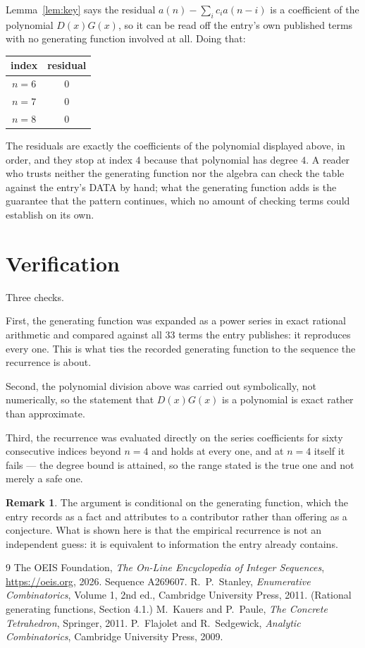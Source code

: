 \documentclass[11pt,a4paper]{article}
\theoremstyle{plain}
\theoremstyle{definition}
\newtheorem{remark}[theorem]{Remark}
\begin{document}
Lemma~\ref{lem:key} says the residual $a(n)-\sum_ic_ia(n-i)$ is a coefficient of the
polynomial $D(x)G(x)$, so it can be read off the entry's own published terms with no
generating function involved at all. Doing that:
\begin{center}
\begin{tabular}{cc}
index & residual \\ \hline
$n=6$ & $0$ \\
$n=7$ & $0$ \\
$n=8$ & $0$
\end{tabular}
\end{center}
The residuals are exactly the coefficients of the polynomial displayed above, in order, and
they stop at index $4$ because that polynomial has degree $4$. A reader who trusts
neither the generating function nor the algebra can check the table against the entry's DATA
by hand; what the generating function adds is the guarantee that the pattern continues, which
no amount of checking terms could establish on its own.

\section{Verification}

Three checks.

First, the generating function was expanded as a power series in exact rational arithmetic and
compared against all $33$ terms the entry publishes: it reproduces every one. This is
what ties the recorded generating function to the sequence the recurrence is about.

Second, the polynomial division above was carried out symbolically, not numerically, so the
statement that $D(x)G(x)$ is a polynomial is exact rather than approximate.

Third, the recurrence was evaluated directly on the series coefficients for sixty consecutive
indices beyond $n=4$ and holds at every one, and at $n=4$ itself it fails --- the
degree bound is attained, so the range stated is the true one and not merely a safe one.

\begin{remark}
The argument is conditional on the generating function, which the entry records as a fact and
attributes to a contributor rather than offering as a conjecture. What is shown here is that
the empirical recurrence is not an independent guess: it is equivalent to information the
entry already contains.
\end{remark}

\begin{thebibliography}{9}
 The OEIS Foundation, \emph{The On-Line Encyclopedia of Integer
Sequences}, \url{https://oeis.org}, 2026. Sequence A269607.
 R.~P.~Stanley, \emph{Enumerative Combinatorics}, Volume 1, 2nd ed.,
Cambridge University Press, 2011. (Rational generating functions, Section 4.1.)
 M.~Kauers and P.~Paule, \emph{The Concrete Tetrahedron}, Springer, 2011.
 P.~Flajolet and R.~Sedgewick, \emph{Analytic Combinatorics}, Cambridge
University Press, 2009.
\end{thebibliography}
\end{document}
